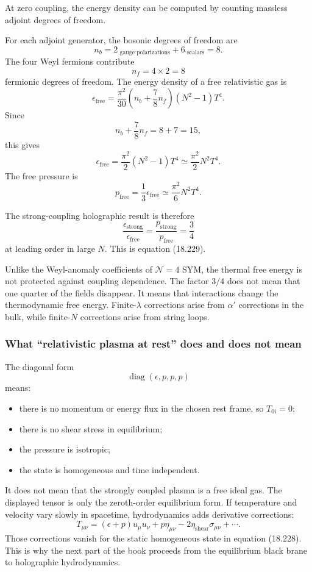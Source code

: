 \documentclass[
  10pt,
  a4paper,
  openany]{book}
\providecommand{\tightlist}{%
  \setlength{\itemsep}{0pt}\setlength{\parskip}{0pt}}
\begin{document}
At zero coupling, the energy density can be computed by counting
massless adjoint degrees of freedom.

For each adjoint generator, the bosonic degrees of freedom are \[
n_b
=2_{\text{ gauge polarizations}}
+6_{\text{ scalars}}
=8.
\] The four Weyl fermions contribute \[
n_f
=4\times2
=8
\] fermionic degrees of freedom. The energy density of a free
relativistic gas is \[
\epsilon_{\mathrm{free}}
=
\frac{\pi^2}{30}
\left(
n_b+\frac78n_f
\right)
(N^2-1)T^4.
\] Since \[
n_b+\frac78n_f
=8+7
=15,
\] this gives \[
\boxed{
\epsilon_{\mathrm{free}}
=
\frac{\pi^2}{2}
(N^2-1)T^4
\simeq
\frac{\pi^2}{2}N^2T^4
}.
\] The free pressure is \[
p_{\mathrm{free}}
=\frac13\epsilon_{\mathrm{free}}
\simeq
\frac{\pi^2}{6}N^2T^4.
\]

The strong-coupling holographic result is therefore \[
\boxed{
\frac{\epsilon_{\mathrm{strong}}}
{\epsilon_{\mathrm{free}}}
=
\frac{p_{\mathrm{strong}}}
{p_{\mathrm{free}}}
=\frac34
}
\] at leading order in large \(N\). This is equation (18.229).

Unlike the Weyl-anomaly coefficients of \(\mathcal N=4\) SYM, the
thermal free energy is not protected against coupling dependence. The
factor \(3/4\) does not mean that one quarter of the fields disappear.
It means that interactions change the thermodynamic free energy.
Finite-\(\lambda\) corrections arise from \(\alpha'\) corrections in the
bulk, while finite-\(N\) corrections arise from string loops.

\subsubsection{What ``relativistic plasma at rest'' does and does not
mean}\label{what-relativistic-plasma-at-rest-does-and-does-not-mean}

The diagonal form \[
\operatorname{diag}(\epsilon,p,p,p)
\] means:

\begin{itemize}
\tightlist
\item
  there is no momentum or energy flux in the chosen rest frame, so
  \(T_{0i}=0\);
\item
  there is no shear stress in equilibrium;
\item
  the pressure is isotropic;
\item
  the state is homogeneous and time independent.
\end{itemize}

It does not mean that the strongly coupled plasma is a free ideal gas.
The displayed tensor is only the zeroth-order equilibrium form. If
temperature and velocity vary slowly in spacetime, hydrodynamics adds
derivative corrections: \[
T_{\mu\nu}
=
(\epsilon+p)u_\mu u_\nu
+p\eta_{\mu\nu}
-2\eta_{\mathrm{shear}}\sigma_{\mu\nu}
+\cdots.
\] Those corrections vanish for the static homogeneous state in equation
(18.228). This is why the next part of the book proceeds from the
equilibrium black brane to holographic hydrodynamics.
\end{document}
